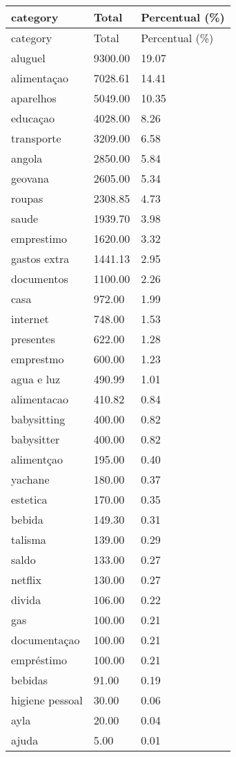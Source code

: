 \documentclass[
  8pt,
  a4paper,
  DIV=11,
  numbers=noendperiod]{scrartcl}
\begin{document}
\begin{figure}
\begin{minipage}{0.50\linewidth}
\begin{longtable}[]{@{}lll@{}}
\caption{}\label{T_4ca06}\tabularnewline
\toprule\noalign{}
category & Total & Percentual (\%) \\
\midrule\noalign{}
\endfirsthead
\toprule\noalign{}
category & Total & Percentual (\%) \\
\midrule\noalign{}
\endhead
\bottomrule\noalign{}
\endlastfoot
aluguel & 9300.00 & 19.07 \\
alimentaçao & 7028.61 & 14.41 \\
aparelhos & 5049.00 & 10.35 \\
educaçao & 4028.00 & 8.26 \\
transporte & 3209.00 & 6.58 \\
angola & 2850.00 & 5.84 \\
geovana & 2605.00 & 5.34 \\
roupas & 2308.85 & 4.73 \\
saude & 1939.70 & 3.98 \\
emprestimo & 1620.00 & 3.32 \\
gastos extra & 1441.13 & 2.95 \\
documentos & 1100.00 & 2.26 \\
casa & 972.00 & 1.99 \\
internet & 748.00 & 1.53 \\
presentes & 622.00 & 1.28 \\
emprestmo & 600.00 & 1.23 \\
agua e luz & 490.99 & 1.01 \\
alimentacao & 410.82 & 0.84 \\
babysitting & 400.00 & 0.82 \\
babysitter & 400.00 & 0.82 \\
alimentçao & 195.00 & 0.40 \\
yachane & 180.00 & 0.37 \\
estetica & 170.00 & 0.35 \\
bebida & 149.30 & 0.31 \\
talisma & 139.00 & 0.29 \\
saldo & 133.00 & 0.27 \\
netflix & 130.00 & 0.27 \\
divida & 106.00 & 0.22 \\
gas & 100.00 & 0.21 \\
documentaçao & 100.00 & 0.21 \\
empréstimo & 100.00 & 0.21 \\
bebidas & 91.00 & 0.19 \\
higiene pessoal & 30.00 & 0.06 \\
ayla & 20.00 & 0.04 \\
ajuda & 5.00 & 0.01 \\
\end{longtable}


\end{minipage}
\end{figure}
\end{document}
